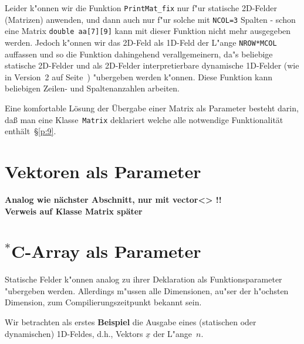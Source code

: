 Leider k"onnen wir die Funktion \verb|PrintMat_fix| nur f"ur
statische 2D-Felder (Matrizen) anwenden, und dann auch nur f"ur
solche mit \verb|NCOL=3| Spalten - schon eine Matrix
\verb|double aa[7][9]| kann mit dieser Funktion nicht mehr ausgegeben
werden.
Jedoch k"onnen wir das 2D-Feld als 1D-Feld der L"ange \verb|NROW*MCOL|
auffassen und so die Funktion dahingehend verallgemeinern, da"s
beliebige statische 2D-Felder und als 2D-Felder interpretierbare
dynamische 1D-Felder
(wie in Version~2 auf Seite~\pageref{page:2DarrayVariant2})
"ubergeben werden k"onnen. Diese Funktion kann beliebigen Zeilen- und Spaltenanzahlen arbeiten.
%
%

Eine komfortable Lösung der Übergabe einer Matrix als Parameter besteht darin, 
daß man eine Klasse~\texttt{Matrix} deklariert welche alle notwendige Funktionalität 
enthält~\S\ref{p:9}.
%
%
\ifcteil
\section{Vektoren als Parameter}
\label{sec:7.4}
%
\textbf{\Large  Analog wie nächster Abschnitt, nur mit vector<> !! \\
Verweis auf Klasse Matrix später}
%
\section{\mbox{}$^{*}$C-Array als Parameter}
\label{sec:7.4}
%
%
Statische Felder k"onnen analog zu ihrer Deklaration als Funktionsparameter
"ubergeben werden. Allerdings m"ussen alle Dimensionen, au"ser der
h"ochsten Dimension, zum Compilierungszeitpunkt bekannt sein.

Wir betrachten als erstes \textbf{Beispiel} die Ausgabe eines
(statischen oder dynamischen) 1D-Feldes,
d.h., Vektors $\underline{x}$ der L"ange~$n$.
%

